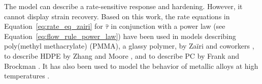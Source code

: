 The model can describe a rate-sensitive response and hardening.
However, it cannot display strain recovery.
Based on this work, the rate equations in Equation~\eqref{eq:rate_eq_zairi} for $\hat \tau$ in conjunction with a power law (see Equation~\eqref{eq:flow_rule_power_law}) have been used in models describing poly(methyl methacrylate) (PMMA), a glassy polymer, by Zaïri and coworkers \citep{zairiPhenomenologicalNonlinearModelling2005, zairiElastoviscoplasticConstitutiveEquations2007,zairiModellingElastoviscoplasticDamage2008}, to describe HDPE by Zhang and Moore \citep{zhangNonlinearMechanicalResponse1997}, and to describe PC by Frank and Brockman \citep{frankViscoelasticViscoplasticConstitutive2001}.
It has also been used to model the behavior of metallic alloys at high temperatures \citep{desouzanetoComputationalMethodsPlasticity2008}.


